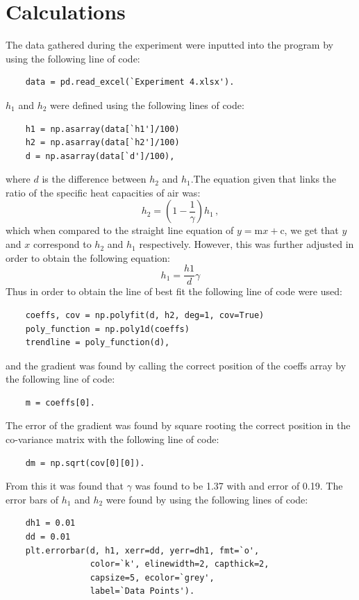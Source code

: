\documentclass[12pt, a4paper]{article}
\begin{document}
\section*{Calculations}
The data gathered during the experiment were inputted into the program by using the following line of code:
\begin{lstlisting}
    data = pd.read_excel(`Experiment 4.xlsx').
\end{lstlisting}
$h_1$ and $h_2$ were defined using the following lines of code:
\begin{lstlisting}
    h1 = np.asarray(data[`h1']/100)
    h2 = np.asarray(data[`h2']/100)
    d = np.asarray(data[`d']/100),
\end{lstlisting}
where $d$ is the difference between $h_2$ and $h_1$.The equation given that links the ratio of the specific heat capacities of air was:
\begin{equation*}
    h_2 = \left(1-\frac{1}{\gamma}\right)h_1\,,
\end{equation*}
which when compared to the straight line equation of $y=\text{m}x+\text{c}$, we get that $y$ and $x$ correspond to $h_2$ and $h_1$ respectively. However, this was further adjusted in order to obtain the following equation:
\begin{equation*}
    h_1 = \frac{h1}{d}\gamma
\end{equation*}
Thus in order to obtain the line of best fit the following line of code were used:
\begin{lstlisting}
    coeffs, cov = np.polyfit(d, h2, deg=1, cov=True)
    poly_function = np.poly1d(coeffs)
    trendline = poly_function(d),
\end{lstlisting}
and the gradient was found by calling the correct position of the coeffs array by the following line of code:
\begin{lstlisting}
    m = coeffs[0].
\end{lstlisting}
The error of the gradient was found by square rooting the correct position in the co-variance matrix with the following line of code:
\begin{lstlisting}
    dm = np.sqrt(cov[0][0]).
\end{lstlisting}
From this it was found that $\gamma$ was found to be 1.37 with and error of 0.19. The error bars of $h_1$ and $h_2$ were found by using the following lines of code:
\begin{lstlisting}
    dh1 = 0.01
    dd = 0.01
    plt.errorbar(d, h1, xerr=dd, yerr=dh1, fmt=`o', 
                 color=`k', elinewidth=2, capthick=2, 
                 capsize=5, ecolor=`grey', 
                 label=`Data Points').
\end{lstlisting}
\end{document}
